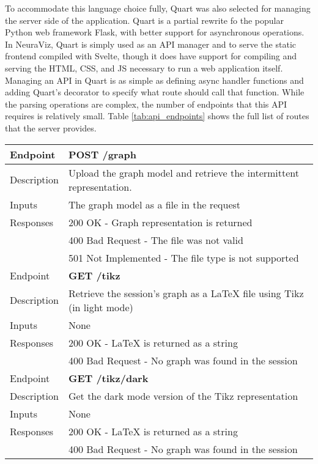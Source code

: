 To accommodate this language choice fully, Quart \cite{quart} was also selected for managing the server side of the application. Quart is a partial rewrite fo the popular Python web framework Flask, with better support for asynchronous operations. In NeuraViz, Quart is simply used as an API manager and to serve the static frontend compiled with Svelte, though it does have support for compiling and serving the HTML, CSS, and JS necessary to run a web application itself. Managing an API in Quart is as simple as defining async handler functions and adding Quart's decorator to specify what route should call that function. While the parsing operations are complex, the number of endpoints that this API requires is relatively small. Table \ref{tab:api_endpoints} shows the full list of routes that the server provides.

\begin{center}
    \begin{tabular}{|l|l|}
        \hline
        \rowcolor{gray!40} Endpoint & \textbf{POST /graph} \\
        \hline
        Description & Upload the graph model and retrieve the intermittent representation. \\
        \hline
        Inputs & The graph model as a file in the request \\
        \hline
        Responses & 200 OK - Graph representation is returned \\
        & 400 Bad Request - The file was not valid \\
        & 501 Not Implemented - The file type is not supported \\
        \hline
        \rowcolor{gray!40} Endpoint & \textbf{GET /tikz}\\
        \hline
        Description & Retrieve the session's graph as a LaTeX file using Tikz (in light mode) \\
        \hline
        Inputs & None \\
        \hline
        Responses & 200 OK - LaTeX is returned as a string \\
        & 400 Bad Request - No graph was found in the session \\
        \hline
        \rowcolor{gray!40} Endpoint & \textbf{GET /tikz/dark} \\
        \hline 
        Description & Get the dark mode version of the Tikz representation \\
        \hline
        Inputs & None \\
        \hline
        Responses & 200 OK - LaTeX is returned as a string \\
        & 400 Bad Request - No graph was found in the session \\
        \hline
    \end{tabular}
    \label{tab:api_endpoints}
\end{center}

